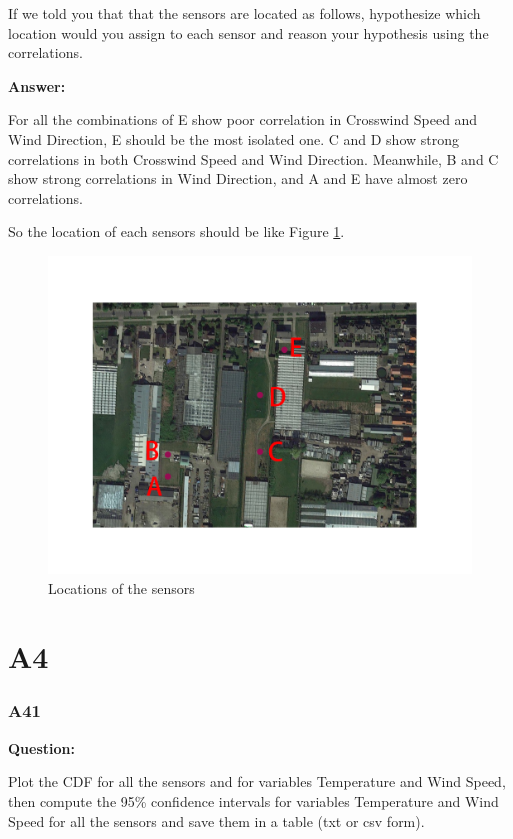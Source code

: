\documentclass[a4paper]{article}
\numberwithin{figure}{section}
\numberwithin{table}{section}
\begin{document}
If we told you that that the sensors are located as follows, hypothesize which location would you assign to each sensor and reason your hypothesis using the correlations.

\textbf{Answer:}

For all the combinations of E show poor correlation in Crosswind Speed and Wind Direction, E should be the most isolated one. C and D show strong correlations in both Crosswind Speed and Wind Direction. Meanwhile, B and C show strong correlations in Wind Direction, and A and E have almost zero correlations. 

So the location of each sensors should be like Figure \ref{Fig:A33}.



\begin{figure}
\centering
\includegraphics[scale=0.45]{Figures/figA33.jpg}
\caption{Locations of the sensors}
\label{Fig:A33}
\end{figure}


\part{A4}

\section{A41}

\textbf{Question:}

Plot the CDF for all the sensors and for variables Temperature and Wind Speed, then compute the 95\% confidence intervals for variables Temperature and Wind Speed for all the sensors and save them in a table (txt or csv form).
\end{document}
